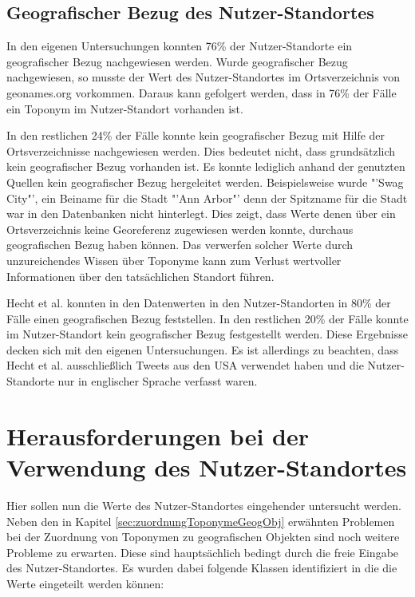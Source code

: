 	

		\subsection{Geografischer Bezug des Nutzer-Standortes} 
			
			In den eigenen Untersuchungen konnten 76\% der Nutzer-Standorte ein geografischer Bezug nachgewiesen werden. 
			Wurde geografischer Bezug nachgewiesen, so musste der Wert des Nutzer-Standortes im Ortsverzeichnis von geonames.org vorkommen. 
			Daraus kann gefolgert werden, dass in 76\% der Fälle ein Toponym im Nutzer-Standort vorhanden ist.
			
			In den restlichen 24\% der Fälle konnte kein geografischer Bezug mit Hilfe der Ortsverzeichnisse nachgewiesen werden. 
			Dies bedeutet nicht, dass grundsätzlich kein geografischer Bezug vorhanden ist. 
			Es konnte lediglich anhand der genutzten Quellen kein geografischer Bezug hergeleitet werden.
			Beispielsweise wurde "'Swag City"', ein Beiname für die Stadt "'Ann Arbor"' denn der Spitzname für die Stadt war in den Datenbanken nicht hinterlegt. 
			Dies zeigt, dass Werte denen über ein Ortsverzeichnis keine Georeferenz zugewiesen werden konnte, durchaus geografischen Bezug haben können.
			Das verwerfen solcher Werte durch unzureichendes Wissen über Toponyme kann zum Verlust wertvoller Informationen über den tatsächlichen Standort führen.

			Hecht et al. konnten in \cite{Hecht2011} den Datenwerten in den Nutzer-Standorten in 80\% der Fälle einen geografischen Bezug feststellen.
			In den restlichen 20\% der Fälle konnte im Nutzer-Standort kein geografischer Bezug festgestellt werden. 
			Diese Ergebnisse decken sich mit den eigenen Untersuchungen. 
			Es ist allerdings zu beachten, dass Hecht et al. ausschließlich Tweets aus den USA verwendet haben und die Nutzer-Standorte nur in englischer Sprache verfasst waren. 
					
	\section{Herausforderungen bei der Verwendung des Nutzer-Standortes} 

		Hier sollen nun die Werte des Nutzer-Standortes eingehender untersucht werden. 
		Neben den in Kapitel \ref{sec:zuordnungToponymeGeogObj} erwähnten Problemen bei der Zuordnung von Toponymen zu geografischen Objekten sind noch weitere Probleme zu erwarten.
		Diese sind hauptsächlich bedingt durch die freie Eingabe des Nutzer-Standortes.
		Es wurden dabei folgende Klassen identifiziert in die die Werte eingeteilt werden können:

